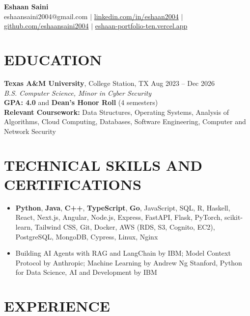 \documentclass[10pt, letterpaper]{article}
\begin{document}
\begin{center}
  {\Large \textbf{Eshaan Saini}} \\[2pt]
  {\small eshaansaini2004@gmail.com $|$ \href{https://linkedin.com/in/eshaan2004}{linkedin.com/in/eshaan2004} $|$ \href{https://github.com/eshaansaini2004}{github.com/eshaansaini2004} $|$ \href{https://eshaan-portfolio-ten.vercel.app}{eshaan-portfolio-ten.vercel.app}}
\end{center}

\vspace{1pt}

\section{EDUCATION}
\textbf{Texas A\&M University}, College Station, TX \hfill Aug 2023 -- Dec 2026 \\
\textit{B.S. Computer Science, Minor in Cyber Security} \\
\textbf{GPA: 4.0} and \textbf{Dean's Honor Roll} (4 semesters) \\
\textbf{Relevant Coursework:} Data Structures, Operating Systems, Analysis of Algorithms, Cloud Computing, Databases, Software Engineering, Computer and Network Security

\section{TECHNICAL SKILLS AND CERTIFICATIONS}
\begin{itemize}
  \item \textbf{Python}, \textbf{Java}, \textbf{C++}, \textbf{TypeScript}, \textbf{Go}, JavaScript, SQL, R, Haskell, React, Next.js, Angular, Node.js, Express, FastAPI, Flask, PyTorch, scikit-learn, Tailwind CSS, Git, Docker, AWS (RDS, S3, Cognito, EC2), PostgreSQL, MongoDB, Cypress, Linux, Nginx
  \item Building AI Agents with RAG and LangChain by IBM; Model Context Protocol by Anthropic; Machine Learning by Andrew Ng Stanford, Python for Data Science, AI and Development by IBM
\end{itemize}

\section{EXPERIENCE}
\end{document}
